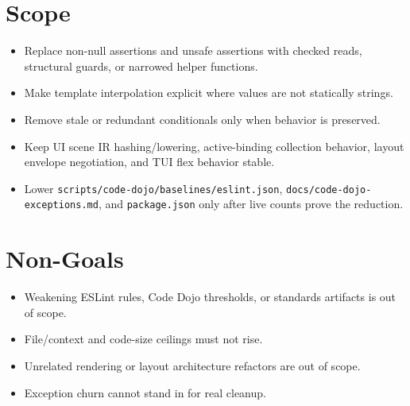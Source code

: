\section{Scope}\label{record-221-scope}

\begin{itemize}
\tightlist
\item
  Replace non-null assertions and unsafe assertions with checked reads, structural guards, or narrowed helper functions.
\item
  Make template interpolation explicit where values are not statically strings.
\item
  Remove stale or redundant conditionals only when behavior is preserved.
\item
  Keep UI scene IR hashing/lowering, active-binding collection behavior, layout envelope negotiation, and TUI flex behavior stable.
\item
  Lower \texttt{s\allowbreak{}c\allowbreak{}r\allowbreak{}i\allowbreak{}p\allowbreak{}t\allowbreak{}s\allowbreak{}/\allowbreak{}c\allowbreak{}o\allowbreak{}d\allowbreak{}e\allowbreak{}-\allowbreak{}d\allowbreak{}o\allowbreak{}j\allowbreak{}o\allowbreak{}/\allowbreak{}b\allowbreak{}a\allowbreak{}s\allowbreak{}e\allowbreak{}l\allowbreak{}i\allowbreak{}n\allowbreak{}e\allowbreak{}s\allowbreak{}/\allowbreak{}e\allowbreak{}s\allowbreak{}l\allowbreak{}i\allowbreak{}n\allowbreak{}t\allowbreak{}.\allowbreak{}j\allowbreak{}s\allowbreak{}o\allowbreak{}n}, \texttt{d\allowbreak{}o\allowbreak{}c\allowbreak{}s\allowbreak{}/\allowbreak{}c\allowbreak{}o\allowbreak{}d\allowbreak{}e\allowbreak{}-\allowbreak{}d\allowbreak{}o\allowbreak{}j\allowbreak{}o\allowbreak{}-\allowbreak{}e\allowbreak{}x\allowbreak{}c\allowbreak{}e\allowbreak{}p\allowbreak{}t\allowbreak{}i\allowbreak{}o\allowbreak{}n\allowbreak{}s\allowbreak{}.\allowbreak{}m\allowbreak{}d}, and \texttt{p\allowbreak{}a\allowbreak{}c\allowbreak{}k\allowbreak{}a\allowbreak{}g\allowbreak{}e\allowbreak{}.\allowbreak{}j\allowbreak{}s\allowbreak{}o\allowbreak{}n} only after live counts prove the reduction.
\end{itemize}

\section{Non-Goals}\label{record-221-non-goals}

\begin{itemize}
\tightlist
\item
  Weakening ESLint rules, Code Dojo thresholds, or standards artifacts is out of scope.
\item
  File/context and code-size ceilings must not rise.
\item
  Unrelated rendering or layout architecture refactors are out of scope.
\item
  Exception churn cannot stand in for real cleanup.
\end{itemize}

